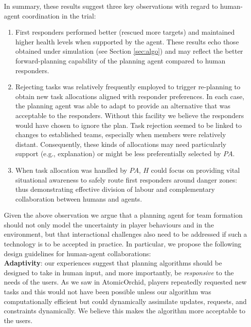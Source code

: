 In summary, these results suggest three key observations with regard to  human-agent coordination in the trial: 
\begin{enumerate}
\item First responders performed better (rescued more targets)  and maintained higher health levels when supported by the agent.  These results echo those obtained under simulation (see Section \ref{sec:algo}) and  may reflect the better forward-planning capability of the planning agent compared to human responders. 
 
\item Rejecting tasks was relatively frequently employed to trigger re-planning to obtain new task allocations aligned with responder preferences.  In each case, the planning agent was able to adapt to provide an alternative  that was acceptable to the responders. Without this facility we believe the responders would have chosen to ignore the plan. Task rejection seemed to be linked to changes to established teams, especially when members were relatively distant. Consequently, these kinds of allocations may need particularly support (e.g., explanation) or might be less preferentially selected by $PA$.

\item When task allocation was handled by $PA$, $H$ could focus on providing vital situational awareness to safely route first responders around danger zones: thus demonstrating effective division of labour and complementary collaboration between humans and agents.
\end{enumerate}

Given the above observation we argue that a planning agent for team formation should not only model the uncertainty in player behaviours and in the environment, but that interactional challenges also need to be addressed  if such a technology is to be accepted in practice. In particular, we propose the following design guidelines for human-agent collaborations:\\

\noindent \textbf{Adaptivity}: our experiences suggest that planning algorithms should be designed to take in human input, and more importantly, be \emph{responsive} to the needs of the users. As we saw in AtomicOrchid, players repeatedly requested new tasks and this would not have been possible unless our algorithm  was computationally efficient but could dynamically assimilate updates, requests, and constraints dynamically. We believe this makes the algorithm more acceptable to the users.\\

